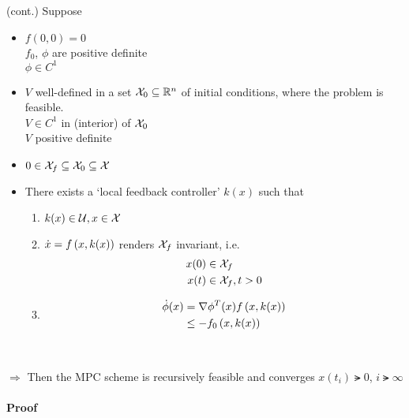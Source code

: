 \begin{theorem}{(cont.)}{}
    Suppose
    \begin{itemize}
        \item $f(0,0) = 0$\\
                $f_0$, $\phi$ are positive definite\\
                $\phi \in C^1$
        \item $V$ well-defined in a set $\setX{0} \subseteq \R^n$ of initial conditions, where the problem is feasible.\\
                $V \in C^1$ in (interior) of $\setX{0}$\\
                $V$ positive definite
        \item $0 \in \setX{f} \subseteq \setX{0} \subseteq \setX{}$
        \item There exists a `local feedback controller' $k(x)$ such that
                \begin{enumerate}
                \renewcommand{\labelenumi}{\bfseries A\arabic{enumi}.}
                    \item $k(x) \in \setU{}, x \in \setX{}$
                    \item $\dot{x} = f \left(  x, k(x)  \right)$ renders $\setX{f}$ invariant, i.e.
                        \begin{align*}
                            x(0) &\in \setX{f}\\
                            x(t) &\in \setX{f}, t>0
                        \end{align*}
                    \item
                        \begin{align*}
                            \dot{\phi}(x)   &= \nabla \phi^T (x) f \left(  x, k(x)  \right) \\
                                            &\leq - f_0 \left(  x, k(x)  \right) \qquad
                        \end{align*}
                \end{enumerate}
    \end{itemize}~
    
    $\Rightarrow$ Then the MPC scheme is recursively  feasible and converges $x(t_i) \lat{} 0$, $i \lat{} \infty$  
\end{theorem}

\paragraph{Proof} ~\\
\begin{figure}[H]
    \centering
\end{figure}

